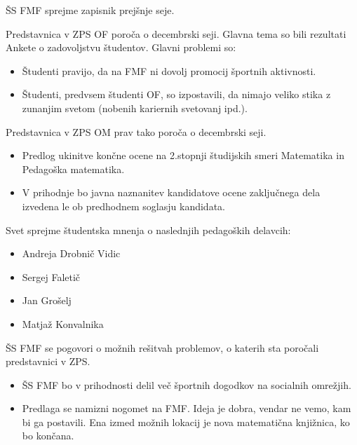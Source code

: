 \documentclass{seja}
\begin{document}
\begin{ad}
    
    \item
    \begin{sklep*}
        ŠS FMF sprejme zapisnik prejšnje seje.
    \end{sklep*}
   
    \item
    Predstavnica v ZPS OF poroča o decembrski seji. Glavna tema so bili rezultati Ankete o zadovoljstvu študentov. Glavni problemi so:
    \begin{itemize}
        \item Študenti pravijo, da na FMF ni dovolj promocij športnih aktivnosti. 
    \item Študenti, predvsem študenti OF, so izpostavili, da nimajo veliko stika z zunanjim svetom (nobenih kariernih svetovanj ipd.).
    \end{itemize}
    Predstavnica v ZPS OM prav tako poroča o decembrski seji.
    \begin{itemize}
        \item Predlog ukinitve končne ocene na 2.stopnji študijskih smeri Matematika in Pedagoška matematika.
        \item V prihodnje bo javna naznanitev kandidatove ocene zaključnega dela izvedena le ob predhodnem soglasju kandidata. 
    \end{itemize}
    \item
    \begin{sklep*}
    Svet sprejme študentska mnenja o naslednjih pedagoških delavcih:
    \begin{itemize}
        \item Andreja Drobnič Vidic
        \item Sergej Faletič
        \item Jan Grošelj
        \item Matjaž Konvalnika
    \end{itemize}
    \end{sklep*}
    \item
    ŠS FMF se pogovori o možnih rešitvah problemov, o katerih sta poročali predstavnici v ZPS.
    \begin{itemize}
        \item 
        ŠS FMF bo v prihodnosti delil več športnih dogodkov na socialnih omrežjih.
        \item
        Predlaga se namizni nogomet na FMF. Ideja je dobra, vendar ne vemo, kam bi ga postavili. Ena izmed možnih lokacij je nova matematična knjižnica, ko bo končana.

\end{itemize}
\end{ad}
\end{document}
